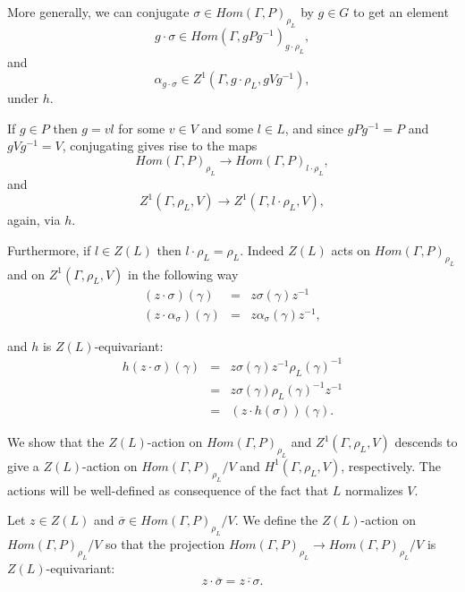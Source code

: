 More generally, we can conjugate $\sigma\in Hom(\Gamma, P)_{\rho_L}$ by $g \in G$ to get an element 
\begin{displaymath}
  g \cdot \sigma \in Hom(\Gamma, gPg^{-1})_{g\cdot\rho_L},
\end{displaymath}
and
\begin{displaymath}
  \alpha_{g \cdot \sigma} \in Z^1(\Gamma, g\cdot\rho_L, gVg^{-1}),
\end{displaymath}
under $h$.

If $g\in P$ then $g=vl$ for some $v\in V$ and some $l\in L$, and since $gPg^{-1} = P$ and $gVg^{-1} = V$, conjugating gives rise to the maps
\begin{displaymath}
  Hom(\Gamma, P)_{\rho_L} \rightarrow Hom(\Gamma, P)_{l\cdot\rho_L},
\end{displaymath}
and
\begin{displaymath}
  Z^1(\Gamma, \rho_L, V)\rightarrow Z^1(\Gamma, l\cdot\rho_L, V),
\end{displaymath}
again, via $h$.

Furthermore, if $l\in Z(L)$ then $l\cdot\rho_L = \rho_L$. Indeed $Z(L)$ acts on $Hom(\Gamma, P)_{\rho_L}$ and on $Z^1(\Gamma, \rho_L, V)$ in the following way
\begin{eqnarray*}
  (z \cdot \sigma) (\gamma) &=& z \sigma(\gamma) z^{-1} \\
  (z \cdot \alpha_\sigma) (\gamma) &=&  z \alpha_\sigma(\gamma) z^{-1},
\end{eqnarray*}

and $h$ is $Z(L)$-equivariant:
\begin{eqnarray*}
  h(z \cdot \sigma)(\gamma) &=&  z \sigma(\gamma) z^{-1} \rho_L(\gamma)^{-1} \\
  &=& z \sigma(\gamma) \rho_L(\gamma)^{-1} z^{-1} \\
  &=& (z \cdot h(\sigma))(\gamma).
\end{eqnarray*}

We show that the $Z(L)$-action on $Hom(\Gamma, P)_{\rho_L}$ and $Z^1(\Gamma, \rho_L, V)$ descends to give a $Z(L)$-action on $Hom(\Gamma, P)_{\rho_L}/V$ and $H^1(\Gamma, \rho_L, V)$, respectively. The actions will be well-defined as consequence of the fact that $L$ normalizes $V$.

Let $z \in Z(L)$ and $\overline{\sigma} \in Hom(\Gamma, P)_{\rho_L}/V$. We define the $Z(L)$-action on $Hom(\Gamma, P)_{\rho_L}/V$ so that the projection $Hom(\Gamma, P)_{\rho_L} \rightarrow Hom(\Gamma, P)_{\rho_L}/V$ is $Z(L)$-equivariant:
\begin{displaymath}
  z \cdot \overline{\sigma} = \overline{z \cdot \sigma}.
\end{displaymath}

